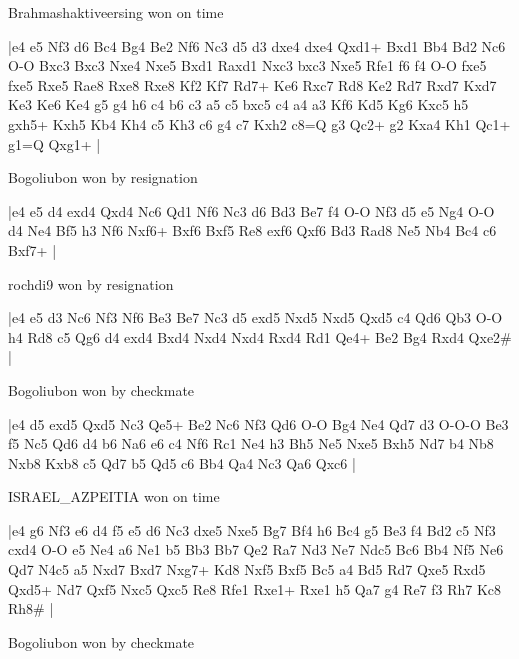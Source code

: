 \showboard

Brahmashaktiveersing won on time

\makegametitle
|e4 e5 Nf3 d6 Bc4 Bg4 Be2 Nf6 Nc3 d5 d3 dxe4 dxe4 Qxd1+ Bxd1 Bb4 Bd2 Nc6 O-O Bxc3 Bxc3 Nxe4 Nxe5 Bxd1 Raxd1 Nxc3 bxc3 Nxe5 Rfe1 f6 f4 O-O fxe5 fxe5 Rxe5 Rae8 Rxe8 Rxe8 Kf2 Kf7 Rd7+ Ke6 Rxc7 Rd8 Ke2 Rd7 Rxd7 Kxd7 Ke3 Ke6 Ke4 g5 g4 h6 c4 b6 c3 a5 c5 bxc5 c4 a4 a3 Kf6 Kd5 Kg6 Kxc5 h5 gxh5+ Kxh5 Kb4 Kh4 c5 Kh3 c6 g4 c7 Kxh2 c8=Q g3 Qc2+ g2 Kxa4 Kh1 Qc1+ g1=Q Qxg1+  |

\showboard

Bogoliubon won by resignation

\makegametitle
|e4 e5 d4 exd4 Qxd4 Nc6 Qd1 Nf6 Nc3 d6 Bd3 Be7 f4 O-O Nf3 d5 e5 Ng4 O-O d4 Ne4 Bf5 h3 Nf6 Nxf6+ Bxf6 Bxf5 Re8 exf6 Qxf6 Bd3 Rad8 Ne5 Nb4 Bc4 c6 Bxf7+  |

\showboard

rochdi9 won by resignation

\makegametitle
|e4 e5 d3 Nc6 Nf3 Nf6 Be3 Be7 Nc3 d5 exd5 Nxd5 Nxd5 Qxd5 c4 Qd6 Qb3 O-O h4 Rd8 c5 Qg6 d4 exd4 Bxd4 Nxd4 Nxd4 Rxd4 Rd1 Qe4+ Be2 Bg4 Rxd4 Qxe2\#  |

\showboard

Bogoliubon won by checkmate

\makegametitle
|e4 d5 exd5 Qxd5 Nc3 Qe5+ Be2 Nc6 Nf3 Qd6 O-O Bg4 Ne4 Qd7 d3 O-O-O Be3 f5 Nc5 Qd6 d4 b6 Na6 e6 c4 Nf6 Rc1 Ne4 h3 Bh5 Ne5 Nxe5 Bxh5 Nd7 b4 Nb8 Nxb8 Kxb8 c5 Qd7 b5 Qd5 c6 Bb4 Qa4 Nc3 Qa6 Qxc6  |

\showboard

ISRAEL\_AZPEITIA won on time

\makegametitle
|e4 g6 Nf3 e6 d4 f5 e5 d6 Nc3 dxe5 Nxe5 Bg7 Bf4 h6 Bc4 g5 Be3 f4 Bd2 c5 Nf3 cxd4 O-O e5 Ne4 a6 Ne1 b5 Bb3 Bb7 Qe2 Ra7 Nd3 Ne7 Ndc5 Bc6 Bb4 Nf5 Ne6 Qd7 N4c5 a5 Nxd7 Bxd7 Nxg7+ Kd8 Nxf5 Bxf5 Bc5 a4 Bd5 Rd7 Qxe5 Rxd5 Qxd5+ Nd7 Qxf5 Nxc5 Qxc5 Re8 Rfe1 Rxe1+ Rxe1 h5 Qa7 g4 Re7 f3 Rh7 Kc8 Rh8\#  |

\showboard

Bogoliubon won by checkmate


